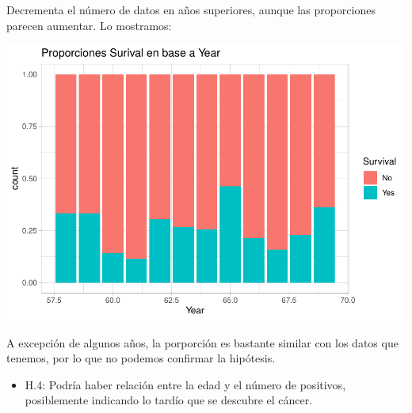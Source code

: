 \documentclass[
]{article}
\newenvironment{Shaded}{\begin{snugshade}}{\end{snugshade}}
\newcommand{\DataTypeTok}[1]{\textcolor[rgb]{0.13,0.29,0.53}{#1}}
\newcommand{\KeywordTok}[1]{\textcolor[rgb]{0.13,0.29,0.53}{\textbf{#1}}}
\newcommand{\NormalTok}[1]{#1}
\newcommand{\OperatorTok}[1]{\textcolor[rgb]{0.81,0.36,0.00}{\textbf{#1}}}
\newcommand{\StringTok}[1]{\textcolor[rgb]{0.31,0.60,0.02}{#1}}
\providecommand{\tightlist}{%
  \setlength{\itemsep}{0pt}\setlength{\parskip}{0pt}}
\begin{document}
Decrementa el número de datos en años superiores, aunque las
proporciones parecen aumentar. Lo mostramos:

\begin{Shaded}
\end{Shaded}

\begin{center}\includegraphics{EDA2_files/figure-latex/unnamed-chunk-36-1} \end{center}

A excepción de algunos años, la porporción es bastante similar con los
datos que tenemos, por lo que no podemos confirmar la hipótesis.

\begin{itemize}
\tightlist
\item
  H.4: Podría haber relación entre la edad y el número de positivos,
  posiblemente indicando lo tardío que se descubre el cáncer.
\end{itemize}
\end{document}

